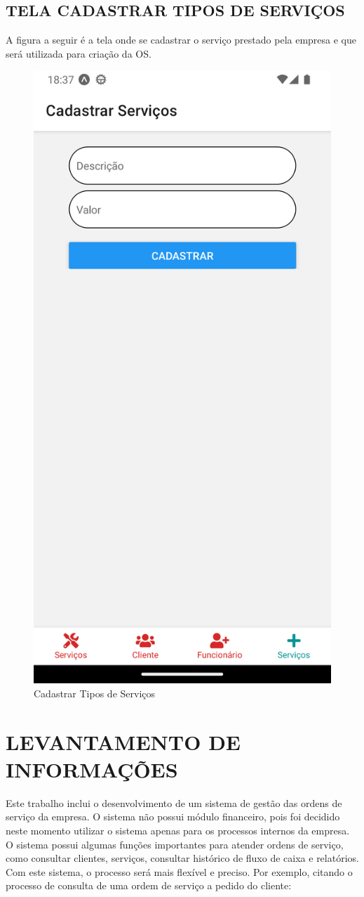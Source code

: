 \subsection{TELA CADASTRAR TIPOS DE SERVIÇOS}
A figura a seguir é a tela onde se cadastrar o serviço prestado pela empresa e que será utilizada para criação da OS.
\begin{figure}[htb]
	\caption{\label{fig_diagrama-classes} Cadastrar Tipos de Serviços}
	\begin{center}
	    \includegraphics[width=0.5\linewidth]{imagens/tela-cadastrar-servico.png}
	\end{center}
\end{figure}

\newpage

\section{LEVANTAMENTO DE INFORMAÇÕES}
Este trabalho inclui o desenvolvimento de um sistema de gestão das ordens de serviço da empresa. O sistema não possui módulo financeiro, pois foi decidido neste momento utilizar o sistema apenas para os processos internos da empresa. O sistema possui algumas funções importantes para atender ordens de serviço, como consultar clientes, serviços, consultar histórico de fluxo de caixa \cite{caixa} e relatórios. Com este sistema, o processo será mais flexível e preciso. Por exemplo, citando o processo de consulta de uma ordem de serviço a pedido do cliente:

